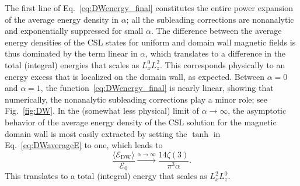 \documentclass[pdflatex,iicol,sn-mathphys-num]{sn-jnl}
\let\a=\alpha
\newcommand{\Ea}{\mathscr{E}}%
\begin{document}
\begin{appendices}
The first line of Eq.~\eqref{eq:DWenergy_final} constitutes the entire power expansion of the average energy density in $\a$; all the subleading corrections are nonanalytic and exponentially suppressed for small $\a$. The difference between the average energy densities of the CSL states for uniform and domain wall magnetic fields is thus dominated by the term linear in $\a$, which translates to a difference in the total (integral) energies that scales as $L_x^0L_z^2$. This corresponds physically to an energy excess that is localized on the domain wall, as expected. Between $\a=0$ and $\a=1$, the function~\eqref{eq:DWenergy_final} is nearly linear, showing that numerically, the nonanalytic subleading corrections play a minor role; see Fig.~\ref{fig:DW}. In the (somewhat less physical) limit of $\a\to\infty$, the asymptotic behavior of the average energy density of the CSL solution for the magnetic domain wall is most easily extracted by setting the $\tanh$ in Eq.~\eqref{eq:DWaverageE} to one, which leads to
\begin{equation}
\frac{\langle\Ea_\text{DW}\rangle}{\Ea_0}\xrightarrow{\a\to\infty}\frac{14\zeta(3)}{\pi^3\a}.
\end{equation}
This translates to a total (integral) energy that scales as $L_x^2L_z^0$.

\end{appendices}



\end{document}
